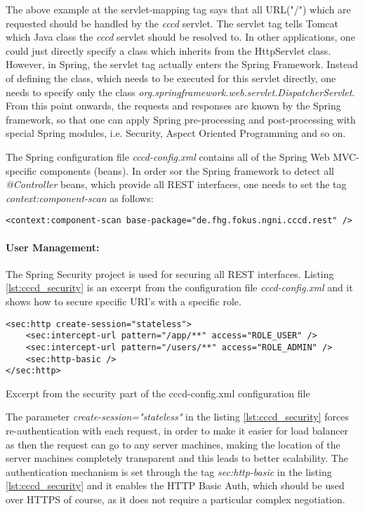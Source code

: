 The above example at the servlet-mapping tag says that all URL("/") which are requested should be handled by the \textit{cccd} servlet. The servlet tag tells Tomcat which Java class the \textit{cccd} servlet should be resolved to. In other applications, one could just directly specify a class which inherits from the HttpServlet class. However, in Spring, the servlet tag actually enters the Spring Framework. Instead of defining the class, which needs to be executed for this servlet directly, one needs to specify only the class \textit{org.springframework.web.servlet.DispatcherServlet}. From this point onwards, the requests and responses are known by the Spring framework, so that one can apply Spring pre-processing and post-processing with special Spring modules, i.e. Security, Aspect Oriented Programming and so on.

The Spring configuration file \textit{cccd-config.xml} contains all of the Spring Web MVC-specific components (beans). In order sor the Spring framework to detect all \textit{@Controller} beans, which provide all \ac{REST} interfaces, one needs to set the tag \textit{context:component-scan} as follows:
\begin{code}
\begin{verbatim}
<context:component-scan base-package="de.fhg.fokus.ngni.cccd.rest" />
\end{verbatim}
\end{code}

\paragraph{User Management:} The Spring Security project is used for securing all \ac{REST} interfaces. Listing \ref{lst:cccd_security} is an excerpt from the configuration file \textit{cccd-config.xml}  and it shows how to secure specific URI's with a specific role.
\begin{code}
\begin{verbatim}
<sec:http create-session="stateless">
 	<sec:intercept-url pattern="/app/**" access="ROLE_USER" />
	<sec:intercept-url pattern="/users/**" access="ROLE_ADMIN" />
	<sec:http-basic />
</sec:http>
\end{verbatim}
\caption{Excerpt from the security part of the cccd-config.xml configuration file}
\label{lst:cccd_security}
\end{code}

The parameter \textit{create-session="stateless"} in the listing \ref{lst:cccd_security} forces re-authentication with each request, in order to make it easier for load balancer as then the request can go to any server machines, making the location of the server machines completely transparent and this leads to better scalability. The authentication mechanism is set through the tag \textit{sec:http-basic} in the listing \ref{lst:cccd_security} and it enables the \ac{HTTP} Basic Auth, which should be used over \ac{HTTPS} of course, as it does not require a particular complex negotiation.

